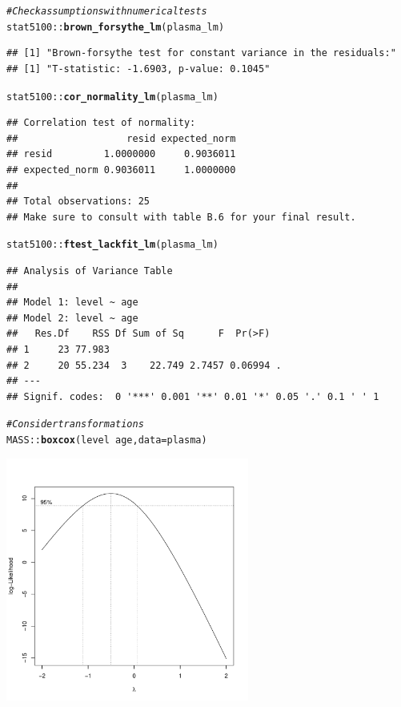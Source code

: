 \documentclass{article}\usepackage[]{graphicx}\usepackage[]{color}
\makeatletter
\newcommand{\hlcom}[1]{\textcolor[rgb]{0.678,0.584,0.686}{\textit{#1}}}%
\newcommand{\hlopt}[1]{\textcolor[rgb]{0,0,0}{#1}}%
\newcommand{\hlstd}[1]{\textcolor[rgb]{0.345,0.345,0.345}{#1}}%
\newcommand{\hlkwc}[1]{\textcolor[rgb]{0.333,0.667,0.333}{#1}}%
\newcommand{\hlkwd}[1]{\textcolor[rgb]{0.737,0.353,0.396}{\textbf{#1}}}%
\newenvironment{kframe}{%
 \def\at@end@of@kframe{}%
 \ifinner\ifhmode%
  \def\at@end@of@kframe{\end{minipage}}%
  \begin{minipage}{\columnwidth}%
 \fi\fi%
 \def\FrameCommand##1{\hskip\@totalleftmargin \hskip-\fboxsep
 \colorbox{shadecolor}{##1}\hskip-\fboxsep
     \hskip-\linewidth \hskip-\@totalleftmargin \hskip\columnwidth}%
 \MakeFramed {\advance\hsize-\width
   \@totalleftmargin\z@ \linewidth\hsize
   \@setminipage}}%
 {\par\unskip\endMakeFramed%
 \at@end@of@kframe}
\newenvironment{knitrout}{}{} %
\makeatother
\begin{document}
\begin{knitrout}
\begin{kframe}\begin{alltt}
\hlcom{# Check assumptions with numerical tests}
\hlstd{stat5100}\hlopt{::}\hlkwd{brown_forsythe_lm}\hlstd{(plasma_lm)}
\end{alltt}
\begin{verbatim}
## [1] "Brown-forsythe test for constant variance in the residuals:"
## [1] "T-statistic: -1.6903, p-value: 0.1045"
\end{verbatim}
\begin{alltt}
\hlstd{stat5100}\hlopt{::}\hlkwd{cor_normality_lm}\hlstd{(plasma_lm)}
\end{alltt}
\begin{verbatim}
## Correlation test of normality:
##                   resid expected_norm
## resid         1.0000000     0.9036011
## expected_norm 0.9036011     1.0000000
## 
## Total observations: 25
## Make sure to consult with table B.6 for your final result.
\end{verbatim}
\begin{alltt}
\hlstd{stat5100}\hlopt{::}\hlkwd{ftest_lackfit_lm}\hlstd{(plasma_lm)}
\end{alltt}
\begin{verbatim}
## Analysis of Variance Table
## 
## Model 1: level ~ age
## Model 2: level ~ age
##   Res.Df    RSS Df Sum of Sq      F  Pr(>F)  
## 1     23 77.983                              
## 2     20 55.234  3    22.749 2.7457 0.06994 .
## ---
## Signif. codes:  0 '***' 0.001 '**' 0.01 '*' 0.05 '.' 0.1 ' ' 1
\end{verbatim}
\begin{alltt}
\hlcom{# Consider transformations}
\hlstd{MASS}\hlopt{::}\hlkwd{boxcox}\hlstd{(level} \hlopt{~} \hlstd{age,} \hlkwc{data} \hlstd{= plasma)}
\end{alltt}
\end{kframe}

{\centering \includegraphics[width=0.6\textwidth]{figure/unnamed-chunk-1-2} 

}
\end{knitrout}
\end{document}
